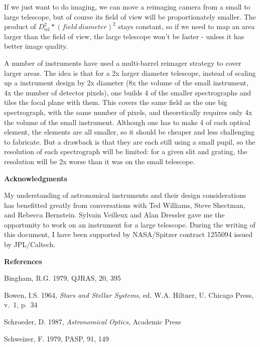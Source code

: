 \documentclass[12pt]{article}
\begin{document}
If we just want to do imaging, we can move a reimaging camera
from a small to large telescope, but of course its field of
view will be proportionately smaller.  The product of 
$D_{\mathrm{tel}}^2 * (field\ diameter)^2$ stays constant, so if we need to
map an area larger than the field of view, the large telescope won't be
faster - unless it has better image quality.

A number of instruments have used a multi-barrel reimager
strategy to cover larger areas.  The idea is that for a 2x larger
diameter
telescope, instead of scaling up a instrument design by 2x diameter
(8x the volume of the small instrument, 4x the number of detector
pixels), one builds 4 of the 
smaller spectrographs and tiles the focal plane with them.  This 
covers the same field as the one big spectrograph, with the same
number of pixels, and theoretically
requires only 4x the volume of the small instrument.  Although one 
has to make 4 of each optical element, the elements are all smaller, 
so it should be cheaper and less challenging to fabricate.  But a 
drawback is that they are each still
using a small pupil, so the resolution of each spectrograph 
will be limited: for a given slit and grating, the resolution will
be 2x worse than it was on the small telescope.



\vspace{1 in}

\bigskip


{\bf Acknowledgments}

My understanding of astronomical instruments and their design
considerations has benefitted greatly from conversations with
Ted Williams, Steve Shectman, and Rebecca Bernstein.
Sylvain Veilleux and Alan Dressler gave me the opportunity to
work on an instrument for a large telescope.  During the
writing of this document, I have been supported by 
NASA/Spitzer contract 1255094 issued by JPL/Caltech.

\bigskip

{\bf References}

Bingham, R.G. 1979, QJRAS, 20, 395

Bowen, I.S. 1964, {\it Stars and Stellar Systems}, ed. W.A. Hiltner,
U. Chicago Press, v.\ 1, p.\ 34

Schroeder, D. 1987, {\it Astronomical Optics}, Academic Press

Schweizer, F. 1979, PASP, 91, 149
\end{document}
